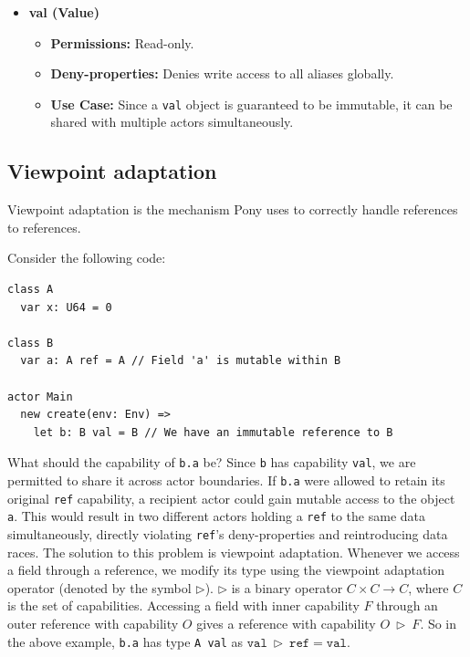 \begin{itemize}
    \item \textbf{val (Value)}
    \begin{itemize}
        \item \textbf{Permissions:} Read-only.
        \item \textbf{Deny-properties:} Denies write access to all aliases globally.
        \item \textbf{Use Case:} Since a \texttt{val} object is guaranteed to be immutable, it can be shared with multiple actors simultaneously.
    \end{itemize}
\end{itemize}

\subsection{Viewpoint adaptation} \label{sec:preparation_viewpoint_adaptation}
Viewpoint adaptation is the mechanism Pony uses to correctly handle references to references.

Consider the following code:
\begin{verbatim}
class A
  var x: U64 = 0

class B
  var a: A ref = A // Field 'a' is mutable within B

actor Main
  new create(env: Env) =>
    let b: B val = B // We have an immutable reference to B
\end{verbatim}

What should the capability of \texttt{b.a} be? Since \texttt{b} has capability \texttt{val}, we are permitted to share it across actor boundaries. If \texttt{b.a} were allowed to retain its original \texttt{ref} capability, a recipient actor could gain mutable access to the object \texttt{a}. This would result in two different actors holding a \texttt{ref} to the same data simultaneously, directly violating \texttt{ref}'s deny-properties and reintroducing data races. The solution to this problem is viewpoint adaptation. Whenever we access a field through a reference, we modify its type using the viewpoint adaptation operator (denoted by the symbol $\triangleright$). $\triangleright$ is a binary operator $C \times C \rightarrow C$, where $C$ is the set of capabilities. Accessing a field with inner capability $F$ through an outer reference with capability $O$ gives a reference with capability $O \ \triangleright \ F$. So in the above example, \texttt{b.a} has type \texttt{A val} as $\texttt{val} \ \triangleright \ \texttt{ref} = \texttt{val}$.

